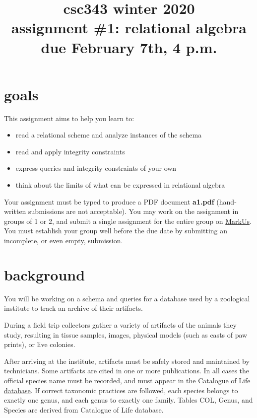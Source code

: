 \documentclass[boldsans]{article}
\title{csc343 winter 2020\\assignment \#1: relational algebra\\
  {\bf due February 7th, 4 p.m.}}
\begin{document}
\maketitle\vspace{-2\baselineskip}
\noindent\section*{goals}
This assignment aims to help you learn to:
\begin{itemize}
\item read a relational scheme and analyze instances of the schema
\item read and apply integrity constraints
\item express queries and integrity constraints of your own
\item think about the limits of what can be expressed in relational algebra
\end{itemize}
Your assignment must be typed to produce a PDF document
\textbf{a1.pdf} (hand-written submissions are not acceptable).  You
may work on the assignment in groups of 1 or 2, and submit a
single assignment for the entire group on
\href{https://markus.cdf.toronto.edu/csc343-2020-01}{MarkUs}.  You
must establish your group well before the due date by submitting an
incomplete, or even empty, submission.
\section*{background}
You will be working on a schema and queries for a database used by a
zoological institute to track an archive of their artifacts.

During a field trip collectors gather a variety of artifacts of the
animals they study, resulting in tissue samples, images, physical
models (such as casts of paw prints), or live colonies.

After arriving at the institute, artifacts must be safely stored and
maintained by technicians.  Some artifacts are cited in one or more
publications.  In all cases the official species name must be
recorded, and must appear in the
\href{https://www.catalogueoflife.org/}{Catalogue of Life database}.
If correct taxonomic practices are followed, each species belongs to
exactly one genus, and each genus to exactly one family. Tables COL,
Genus, and Species are derived from Catalogue of Life database.
\end{document}

